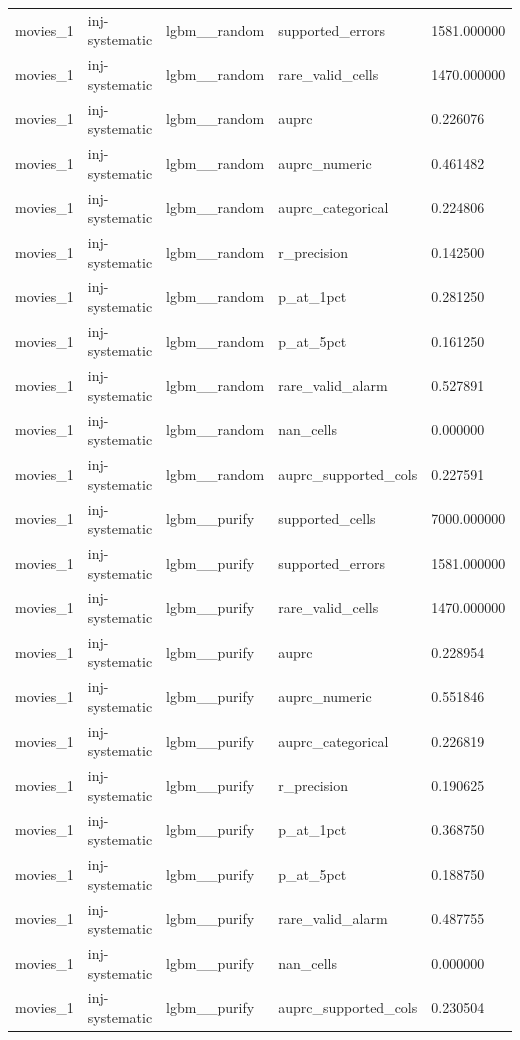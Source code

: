 \begin{tabular}{lllll}
movies\_1 & inj-systematic & lgbm\_\_random & supported\_errors & 1581.000000 \\
movies\_1 & inj-systematic & lgbm\_\_random & rare\_valid\_cells & 1470.000000 \\
movies\_1 & inj-systematic & lgbm\_\_random & auprc & 0.226076 \\
movies\_1 & inj-systematic & lgbm\_\_random & auprc\_numeric & 0.461482 \\
movies\_1 & inj-systematic & lgbm\_\_random & auprc\_categorical & 0.224806 \\
movies\_1 & inj-systematic & lgbm\_\_random & r\_precision & 0.142500 \\
movies\_1 & inj-systematic & lgbm\_\_random & p\_at\_1pct & 0.281250 \\
movies\_1 & inj-systematic & lgbm\_\_random & p\_at\_5pct & 0.161250 \\
movies\_1 & inj-systematic & lgbm\_\_random & rare\_valid\_alarm & 0.527891 \\
movies\_1 & inj-systematic & lgbm\_\_random & nan\_cells & 0.000000 \\
movies\_1 & inj-systematic & lgbm\_\_random & auprc\_supported\_cols & 0.227591 \\
movies\_1 & inj-systematic & lgbm\_\_purify & supported\_cells & 7000.000000 \\
movies\_1 & inj-systematic & lgbm\_\_purify & supported\_errors & 1581.000000 \\
movies\_1 & inj-systematic & lgbm\_\_purify & rare\_valid\_cells & 1470.000000 \\
movies\_1 & inj-systematic & lgbm\_\_purify & auprc & 0.228954 \\
movies\_1 & inj-systematic & lgbm\_\_purify & auprc\_numeric & 0.551846 \\
movies\_1 & inj-systematic & lgbm\_\_purify & auprc\_categorical & 0.226819 \\
movies\_1 & inj-systematic & lgbm\_\_purify & r\_precision & 0.190625 \\
movies\_1 & inj-systematic & lgbm\_\_purify & p\_at\_1pct & 0.368750 \\
movies\_1 & inj-systematic & lgbm\_\_purify & p\_at\_5pct & 0.188750 \\
movies\_1 & inj-systematic & lgbm\_\_purify & rare\_valid\_alarm & 0.487755 \\
movies\_1 & inj-systematic & lgbm\_\_purify & nan\_cells & 0.000000 \\
movies\_1 & inj-systematic & lgbm\_\_purify & auprc\_supported\_cols & 0.230504 \\

\end{tabular}
